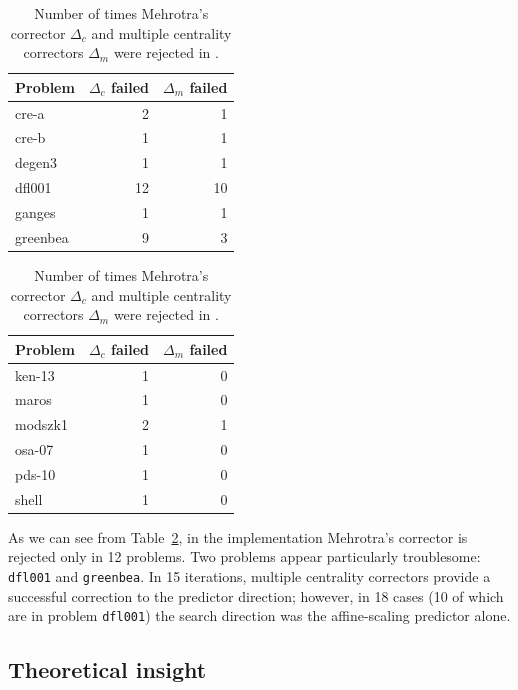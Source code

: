 \begin{table}[ht]
  \centering
  \begin{minipage}[t]{0.45\textwidth}
    \begin{tabular}{|l|r|r|}\hline
      Problem  & $\Delta_c$ failed & $\Delta_m$ failed \\ \hline
      cre-a    &  2  &  1 \\
      cre-b    &  1  &  1 \\
      degen3   &  1  &  1 \\ 
      dfl001   & 12  & 10 \\
      ganges   &  1  &  1 \\
      greenbea &  9  &  3 \\ \hline
    \end{tabular}
  \end{minipage} \hspace{1em}
  \begin{minipage}[t]{0.45\textwidth}
    \begin{tabular}{|l|r|r|}\hline
      Problem  & $\Delta_c$ failed & $\Delta_m$ failed \\ \hline
      ken-13   &  1  &  0 \\
      maros    &  1  &  0 \\
      modszk1  &  2  &  1 \\
      osa-07   &  1  &  0 \\
      pds-10   &  1  &  0 \\
      shell    &  1  &  0 \\ \hline
    \end{tabular}
  \end{minipage}
  \caption{Number of times Mehrotra's corrector $\Delta_c$ and
           multiple centrality correctors $\Delta_m$ were rejected in \HOPDM.}
  \label{table:MehrotraFailure}
\end{table}

As we can see from Table~\ref{table:MehrotraFailure}, in the
\HOPDM implementation Mehrotra's corrector is rejected only in
12 problems. Two problems appear particularly troublesome:
{\tt dfl001} and {\tt greenbea}.
In 15 iterations, multiple centrality correctors provide a
successful correction to the predictor direction;
however, in 18 cases (10 of which are in problem {\tt dfl001})
the search direction was the affine-scaling predictor alone.

%
%
\subsection{Theoretical insight}

